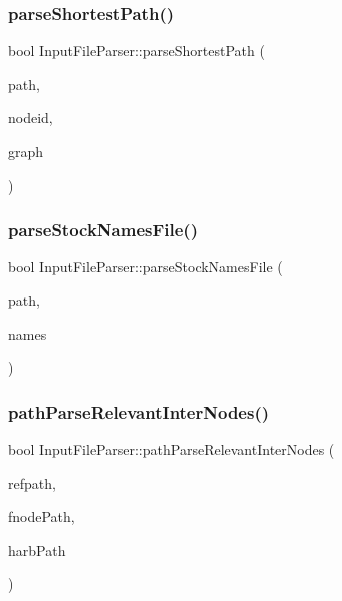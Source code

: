 \mbox{\label{class_input_file_parser_a8bc5aa995e3259f3ad09003316ae6533}} 
\subsubsection{\texorpdfstring{parseShortestPath()}{parseShortestPath()}}
{\footnotesize\ttfamily bool Input\+File\+Parser\+::parse\+Shortest\+Path (\begin{DoxyParamCaption}\item[{const Q\+String \&}]{path,  }\item[{int}]{nodeid,  }\item[{Q\+List$<$ Q\+Pair$<$ int, int $>$ $>$ \&}]{graph }\end{DoxyParamCaption})}

\mbox{\label{class_input_file_parser_ae2073f6d4a7791b757a170d5f1fbfad2}} 
\subsubsection{\texorpdfstring{parseStockNamesFile()}{parseStockNamesFile()}}
{\footnotesize\ttfamily bool Input\+File\+Parser\+::parse\+Stock\+Names\+File (\begin{DoxyParamCaption}\item[{const Q\+String \&}]{path,  }\item[{Q\+Map$<$ Q\+String, int $>$ \&}]{names }\end{DoxyParamCaption})}

\mbox{\label{class_input_file_parser_a9fdb282b6eb601148bfda85edf1c0ca3}} 
\subsubsection{\texorpdfstring{pathParseRelevantInterNodes()}{pathParseRelevantInterNodes()}}
{\footnotesize\ttfamily bool Input\+File\+Parser\+::path\+Parse\+Relevant\+Inter\+Nodes (\begin{DoxyParamCaption}\item[{const Q\+String \&}]{refpath,  }\item[{Q\+String \&}]{fnode\+Path,  }\item[{Q\+String \&}]{harb\+Path }\end{DoxyParamCaption})}

